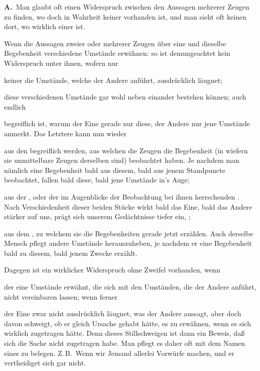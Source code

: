 \vabst \textbf{A.}~Man glaubt oft einen Widerspruch zwischen den Aussagen mehrerer Zeugen zu finden, wo doch in Wahrheit keiner vorhanden ist, und man sieht oft keinen dort, wo wirklich einer ist.
\begin{aufza}
\item Wenn die Aussagen zweier oder mehrerer Zeugen über eine und dieselbe Begebenheit verschiedene Umstände erwähnen: so ist demungeachtet kein Widerspruch unter ihnen, wofern nur
\begin{aufzb}
\item keiner die Umstände, welche der Andere anführt, ausdrücklich läugnet;
\item diese verschiedenen Umstände gar wohl neben einander bestehen können; auch endlich~
\item begreiflich ist, warum der Eine gerade nur diese, der Andere nur jene Umstände anmerkt. Das Letztere kann nun wieder
\begin{aufzc}
\item aus den  begreiflich werden, aus welchen die Zeugen die Begebenheit (in wiefern sie unmittelbare Zeugen derselben sind) beobachtet haben. Je nachdem man nämlich eine Begebenheit bald aus diesem, bald aus jenem Standpuncte beobachtet, fallen bald diese, bald jene Umstände in's Auge;
\item aus der , oder der im Augenblicke der Beobachtung bei ihnen herrschenden . Nach Verschiedenheit dieser beiden Stücke wirkt bald das Eine, bald das Andere stärker auf uns, prägt sich unserem Gedächtnisse tiefer ein, \usw ;
\item aus dem , zu welchem sie die Begebenheiten gerade jetzt erzählen. Auch derselbe Mensch pflegt andere Umstände herauszuheben, je nachdem er eine Begebenheit bald zu diesem, bald jenem Zwecke erzählt.
\end{aufzc}
\end{aufzb}
\item Dagegen ist ein wirklicher Widerspruch ohne Zweifel vorhanden, wenn
\begin{aufzb}
\item der eine Umstände erwähnt, die sich mit den Umständen, die der Andere anführt, nicht vereinbaren lassen; wenn ferner
\item der Eine zwar nicht ausdrücklich läugnet, was der Andere aussagt, aber doch davon schweigt, ob er gleich Ursache gehabt hätte, es zu erwähnen, wenn es sich wirklich zugetragen hätte. Denn dieses Stillschweigen ist dann ein Beweis, daß sich die Sache nicht zugetragen habe. Man pflegt es daher oft mit dem Namen eines  zu belegen. Z.\,B.\ Wenn wir Jemand allerlei Vorwürfe machen, und er vertheidiget sich gar nicht.
\end{aufzb}
\end{aufza}\par

